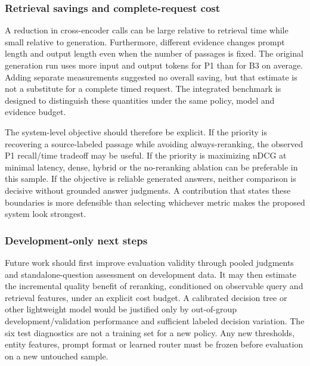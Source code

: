 \documentclass[10pt,a4paper]{article}
\begin{document}
\hypertarget{retrieval-savings-and-complete-request-cost}{%
\subsubsection{Retrieval savings and complete-request
cost}\label{retrieval-savings-and-complete-request-cost}}

A reduction in cross-encoder calls can be large relative to retrieval
time while small relative to generation. Furthermore, different evidence
changes prompt length and output length even when the number of passages
is fixed. The original generation run uses more input and output tokens
for P1 than for B3 on average. Adding separate measurements suggested no
overall saving, but that estimate is not a substitute for a complete
timed request. The integrated benchmark is designed to distinguish these
quantities under the same policy, model and evidence budget.

The system-level objective should therefore be explicit. If the priority
is recovering a source-labeled passage while avoiding always-reranking,
the observed P1 recall/time tradeoff may be useful. If the priority is
maximizing nDCG at minimal latency, dense, hybrid or the no-reranking
ablation can be preferable in this sample. If the objective is reliable
generated answers, neither comparison is decisive without grounded
answer judgments. A contribution that states these boundaries is more
defensible than selecting whichever metric makes the proposed system
look strongest.

\hypertarget{development-only-next-steps}{%
\subsubsection{Development-only next
steps}\label{development-only-next-steps}}

Future work should first improve evaluation validity through pooled
judgments and standalone-question assessment on development data. It may
then estimate the incremental quality benefit of reranking, conditioned
on observable query and retrieval features, under an explicit cost
budget. A calibrated decision tree or other lightweight model would be
justified only by out-of-group development/validation performance and
sufficient labeled decision variation. The six test diagnostics are not
a training set for a new policy. Any new thresholds, entity features,
prompt format or learned router must be frozen before evaluation on a
new untouched sample.
\end{document}
